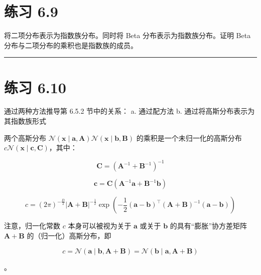 \section*{练习 6.9}

将二项分布表示为指数族分布。同时将 Beta 分布表示为指数族分布。证明 Beta 分布与二项分布的乘积也是指数族的成员。

\medskip\hrule\medskip

\section*{练习 6.10}

通过两种方法推导第 6.5.2 节中的关系： a. 通过配方法 b. 通过将高斯分布表示为其指数族形式

两个高斯分布 $ \mathcal{N}(\boldsymbol{x} \mid \boldsymbol{a}, \boldsymbol{A})\mathcal{N}(\boldsymbol{x} \mid \boldsymbol{b}, \boldsymbol{B}) $ 的乘积是一个未归一化的高斯分布 $ c \mathcal{N}(\boldsymbol{x} \mid \boldsymbol{c}, \boldsymbol{C}) $，其中：

\begin{equation*}
\boldsymbol{C} = (\boldsymbol{A}^{-1} + \boldsymbol{B}^{-1})^{-1}
\end{equation*}

\begin{equation*}
\boldsymbol{c} = \boldsymbol{C}(\boldsymbol{A}^{-1}\boldsymbol{a} + \boldsymbol{B}^{-1}\boldsymbol{b})
\end{equation*}

\begin{equation*}
c = (2\pi)^{-\frac{D}{2}} |\boldsymbol{A} + \boldsymbol{B}|^{-\frac{1}{2}} \exp\left( -\frac{1}{2}(\boldsymbol{a} - \boldsymbol{b})^\top (\boldsymbol{A} + \boldsymbol{B})^{-1}(\boldsymbol{a} - \boldsymbol{b}) \right)
\end{equation*}

注意，归一化常数 $ c $ 本身可以被视为关于 $ \boldsymbol{a} $ 或关于 $ \boldsymbol{b} $ 的具有“膨胀”协方差矩阵 $ \boldsymbol{A} + \boldsymbol{B} $ 的（归一化）高斯分布，即

\begin{equation*}
c = \mathcal{N}(\boldsymbol{a} \mid \boldsymbol{b}, \boldsymbol{A} + \boldsymbol{B}) = \mathcal{N}(\boldsymbol{b} \mid \boldsymbol{a}, \boldsymbol{A} + \boldsymbol{B})
\end{equation*}

。

